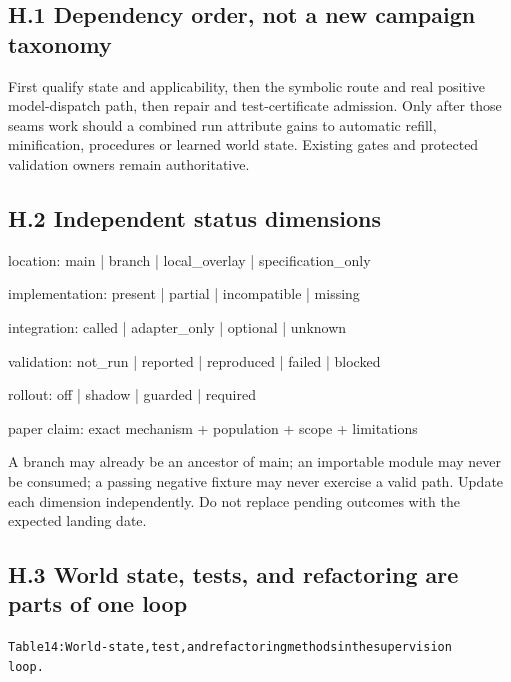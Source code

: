 \subsection*{H.1 Dependency order, not a new campaign taxonomy}

First qualify state and applicability, then the symbolic route and real positive model-dispatch path,
then repair and test-certificate admission. Only after those seams work should a combined run
attribute gains to automatic refill, minification, procedures or learned world state. Existing gates and
protected validation owners remain authoritative.

\subsection*{H.2 Independent status dimensions}

\noindent location: main | branch | local\_overlay | specification\_only\par
\noindent implementation: present | partial | incompatible | missing\par
\noindent integration: called | adapter\_only | optional | unknown\par
\noindent validation: not\_run | reported | reproduced | failed | blocked\par
\noindent rollout: off | shadow | guarded | required\par
\noindent paper claim: exact mechanism + population + scope + limitations\par

A branch may already be an ancestor of main; an importable module may never be consumed; a
passing negative fixture may never exercise a valid path. Update each dimension independently. Do
not replace pending outcomes with the expected landing date.




\subsection*{H.3 World state, tests, and refactoring are parts of one loop}

\begingroup\fontsize{7}{8.4}\selectfont
\begin{alltt}
Table 14: World-state, test, and refactoring methods in the supervision
loop.
\end{alltt}\endgroup

